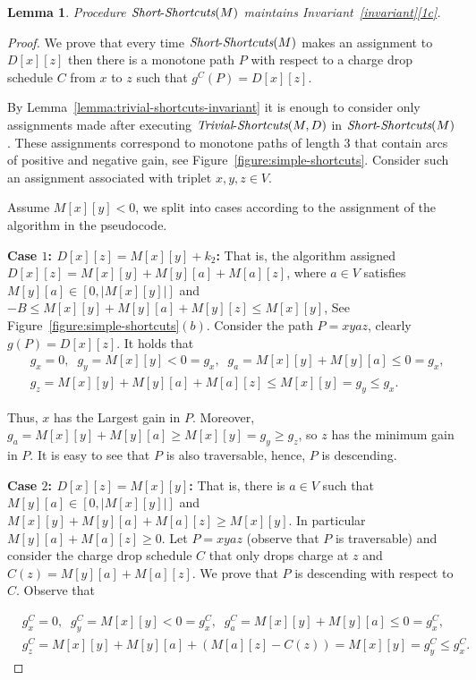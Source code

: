 \documentclass[11pt]{article}
\newtheorem{lemma}[theorem]{Lemma}
\newcommand{\Simple}{\mbox{{\it Short}-{\it Shortcuts}}}
\newcommand{\Trivial}{\mbox{{\it Trivial}-{\it Shortcuts}}}
\begin{document}
\begin{lemma}\label{lemma:simple-shortcuts-invariant}
    Procedure $\Simple(M)$ maintains Invariant~\ref{invariant}\ref{1c}.
\end{lemma}

\begin{proof}
We prove that every time $\Simple(M)$
makes an assignment to $D[x][z]$ then there is a monotone path $P$ with respect to a charge drop schedule $C$ from $x$ to $z$ such that $g^C(P) = D[x][z]$.

By Lemma~\ref{lemma:trivial-shortcuts-invariant} it is enough to consider only assignments made after executing $\Trivial(M,D)$ in $\Simple(M)$. These assignments correspond to monotone paths of length $3$ that contain arcs of positive and negative gain, see Figure~\ref{figure:simple-shortcuts}. Consider such an assignment associated with triplet
 $x,y,z\in V$.
 
Assume $M[x][y]<0$, we split into cases according to the assignment of the algorithm in the pseudocode. 

\textbf{Case $1$: $D[x][z] = M[x][y] +k_2$:} That is, the algorithm assigned $D[x][z] = M[x][y] + M[y][a] + M[a][z]$, where $a\in V$ satisfies $M[y][a] \in [0, |M[x][y]|]$ and $-B \le M[x][y] + M[y][a] + M[y][z] \le M[x][y]$, See Figure~\ref{figure:simple-shortcuts}$(b)$. Consider the path $P=xyaz$, clearly $g(P)=D[x][z]$. It holds that 
\begin{align*}
    &g_x=0,\;\; g_y=M[x][y] < 0 =g_x,\;\; g_a = M[x][y]+M[y][a] \le 0 = g_x,\\
    &g_z = M[x][y]+M[y][a]+M[a][z] \le M[x][y] = g_y \le g_x.
\end{align*}

Thus, $x$ has the Largest gain in $P$. Moreover, $g_a=M[x][y]+M[y][a] \ge M[x][y]=g_y\ge g_z$, so $z$ has the minimum gain in $P$. It is easy to see that $P$ is also traversable, hence, $P$ is descending.

\textbf{Case $2$: $D[x][z] = M[x][y]$:}
That is, there is $a\in V$ such that $M[y][a] \in [0, |M[x][y]|]$ and $M[x][y] + M[y][a] + M[a][z] \ge M[x][y]$.
In particular $M[y][a] + M[a][z] \ge 0$.
Let $P = xyaz$ (observe that $P$ is traversable) and consider the charge drop schedule $C$ that only drops charge at $z$ and $C(z) = M[y][a] + M[a][z]$. We prove that $P$ is descending with respect to $C$. Observe that

\begin{align*}
    &g^C_x=0,\;\; g^C_y=M[x][y] < 0 =g^C_x,\;\; g^C_a = M[x][y]+M[y][a] \le 0 = g^C_x,\\
    &g^C_z = M[x][y]+M[y][a]+(M[a][z] - C(z)) = M[x][y] = g^C_y \le g^C_x.
\end{align*}



\end{proof}
\end{document}
